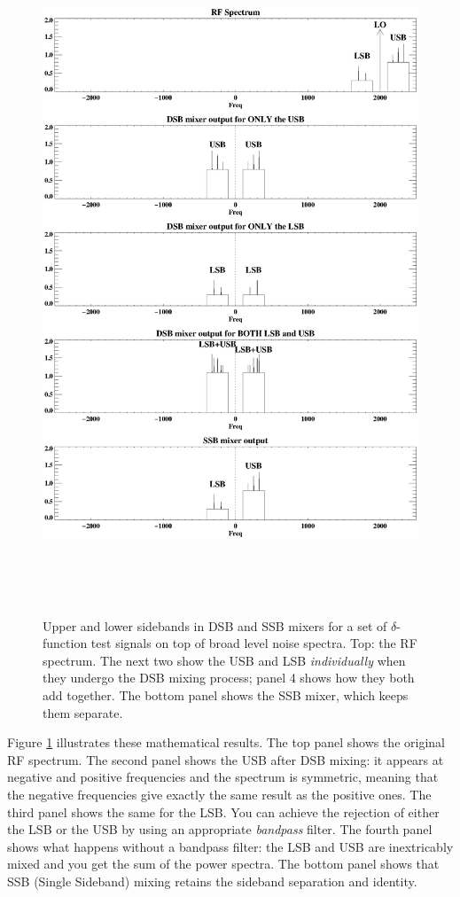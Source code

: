 \documentclass[11pt,preprint]{aastex}
\begin{document}
\begin{figure}[p!]
\hspace{-0.7in}
  \includegraphics[width=7.5in, height=8.0in]{sideband.ps}
\caption{Upper and lower sidebands in DSB and SSB mixers for a set of
$\delta$-function test signals on top of broad level noise spectra. Top:
  the RF
spectrum. The next two show the USB and LSB {\it individually} when
they undergo the DSB mixing process; panel 4 shows how they both add
together. The bottom panel shows the SSB mixer, which keeps them
separate. \label{sideband}}
\end{figure}

Figure \ref{sideband} illustrates these mathematical results. The top
panel shows the original RF spectrum. The second panel shows the USB
after DSB mixing: it appears at negative and positive frequencies and
the spectrum is symmetric, meaning that the negative frequencies give
exactly the same result as the positive ones. The third panel shows the
same for the LSB. You can achieve the rejection of either the LSB or the
USB by using an appropriate {\it bandpass} filter. The fourth panel
shows what happens without a bandpass filter: the LSB and USB are
inextricably mixed and you get the sum of the power spectra. The bottom
panel shows that SSB (Single Sideband) mixing retains the sideband separation and
identity.
\end{document}

